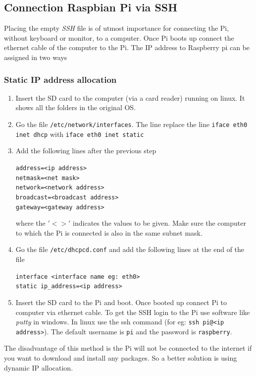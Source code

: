 \documentclass[12pt, a4paper, twoside]{article}
\begin{document}
\subsection{Connection Raspbian Pi via SSH}
	
	Placing the empty \textit{SSH} file is of utmost importance for connecting the Pi, without keyboard or monitor, to a computer. Once Pi boots up connect the ethernet cable of the computer to the Pi. The IP address to Raspberry pi can be assigned in two ways

\subsubsection{Static IP address allocation}
	\begin{enumerate}
		\item Insert the SD card to the computer (via a card reader) running on linux. It shows all the folders in the original OS.
		\item Go the file \texttt{/etc/network/interfaces}. The line replace the line \texttt{iface eth0 inet dhcp} with \texttt{iface eth0 inet static}
		\item Add the following lines after the previous step
		
			\texttt{address=<ip address> \\
					netmask=<net mask> \\
					network=<network address> \\
					broadcast=<broadcast address> \\
					gateway=<gateway address>}

		where the $'< >'$ indicates the values to be given. Make sure the computer to which the Pi is connected is also in the same subnet mask.
		\item Go the file \texttt{/etc/dhcpcd.conf} and add the following lines at the end of the file
				
			\texttt{interface <interface name eg: eth0> \\
					static ip\_address=<ip address> }
		\item Insert the SD card to the Pi and boot. Once booted up connect Pi to computer via ethernet cable. To get the SSH login to the Pi use software like \textit{putty} in windows. In linux use the ssh command (for eg: \texttt{ssh pi@<ip address>}). The default username is \texttt{pi} and the password is \texttt{raspberry}.
	\end{enumerate}	

The disadvantage of this method is the Pi will not be connected to the internet if you want to download and install any packages. So a better solution is using dynamic IP allocation.
\end{document}
